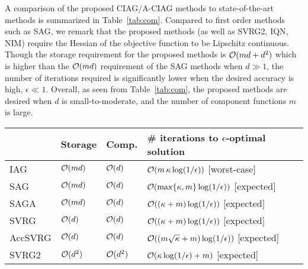 \documentclass[smallextended]{svjour3}       %
\begin{document}
A comparison of the proposed {\sf CIAG}/{\sf A-CIAG} methods to state-of-the-art methods is summarized in Table~\ref{tab:com}. Compared to first order methods such as {\sf SAG}, we remark that the proposed methods (as well as {\sf SVRG2}, {\sf IQN}, {\sf NIM}) require the Hessian of the objective function to be Lipschitz continuous. Though the storage requirement for the proposed methods is ${\cal O}(md+d^2)$ which is higher than the ${\cal O}(md)$ requirement of the {\sf SAG} methods when $d \gg 1$, the number of iterations required is significantly lower when the desired accuracy is high, $\epsilon \ll 1$. Overall, as seen from Table~\ref{tab:com}, the proposed methods are desired when $d$ is small-to-moderate, and the number of component functions $m$ is large.
 

\begin{table}[t]
\begin{center}
\renewcommand\baselinestretch{1.2}\selectfont
{ 
\begin{tabular}{l l l l} 
\toprule 
& Storage & Comp. & 
\# iterations to $\epsilon$-optimal solution
\\
\midrule 
{\sf IAG} \cite{blatt2007convergent} & ${\cal O}(md)$ & ${\cal O}(d)$ & ${\cal O}( m\!~ \kappa \log(1/\epsilon) )$ {\small [worst-case]} \\
\hline
{\sf SAG} \cite{schmidt2017minimizing} & ${\cal O}(md)$ & ${\cal O}(d)$ & ${\cal O}(\max\{ \kappa, m \} \log(1/\epsilon) )$ {\small[expected]}\\
\hline
{\sf SAGA} \cite{defazio2014saga} & ${\cal O}(md)$ & ${\cal O}(d)$ & ${\cal O}( ( \kappa + m) \log(1/\epsilon) )$ {\small[expected]}\\
\hline
{\sf SVRG} \cite{xiao2014proximal} & ${\cal O}(d)$ & ${\cal O}(d)$ & ${\cal O}( ( \kappa + m) \log(1/\epsilon) )$ {\small[expected]} \\
\hline
{\sf AccSVRG} \cite{nitanda2014stochastic} & ${\cal O}(d)$ & ${\cal O}(d)$ & ${\cal O}( ( 
m \sqrt{ \kappa } + m
 ) \log(1/\epsilon) )$ {\small[expected]} \\
\hline
\hline
{\sf SVRG2} \cite{gower2017tracking} & ${\cal O}( d^2 )$ & ${\cal O}(d^2)$  & ${\cal O}( \kappa \log(1/\epsilon) + m )$  {\small[expected]}\\

\end{tabular}}
\end{center}
\end{table}
\end{document}
